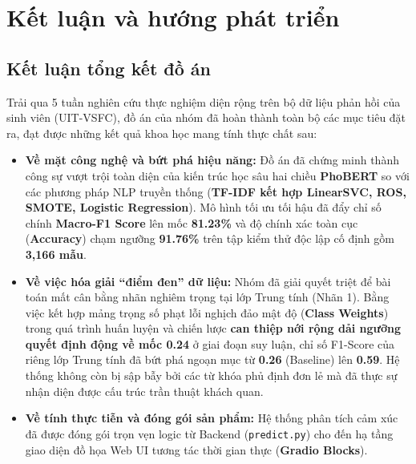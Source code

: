 \documentclass[conference,10pt,a4paper]{IEEEtran}
\begin{document}
\section{Kết luận và hướng phát triển}

\subsection{Kết luận tổng kết đồ án}
\noindent Trải qua 5 tuần nghiên cứu thực nghiệm diện rộng trên bộ dữ liệu phản hồi của sinh viên (UIT-VSFC), đồ án của nhóm đã hoàn thành toàn bộ các mục tiêu đặt ra, đạt được những kết quả khoa học mang tính thực chất sau:
\begin{itemize}
    \item \textbf{Về mặt công nghệ và bứt phá hiệu năng:} Đồ án đã chứng minh thành công sự vượt trội toàn diện của kiến trúc học sâu hai chiều \textbf{PhoBERT} so với các phương pháp NLP truyền thống (\textbf{TF-IDF kết hợp LinearSVC, ROS, SMOTE, Logistic Regression}). Mô hình tối ưu tối hậu đã đẩy chỉ số chính \textbf{Macro-F1 Score} lên mốc \textbf{81.23\%} và độ chính xác toàn cục (\textbf{Accuracy}) chạm ngưỡng \textbf{91.76\%} trên tập kiểm thử độc lập cố định gồm \textbf{3,166 mẫu}.
    
    \item \textbf{Về việc hóa giải ``điểm đen'' dữ liệu:} Nhóm đã giải quyết triệt để bài toán mất cân bằng nhãn nghiêm trọng tại lớp Trung tính (Nhãn 1). Bằng việc kết hợp mảng trọng số phạt lỗi nghịch đảo mật độ (\textbf{Class Weights}) trong quá trình huấn luyện và chiến lược \textbf{can thiệp nới rộng dải ngưỡng quyết định động về mốc 0.24} ở giai đoạn suy luận, chỉ số F1-Score của riêng lớp Trung tính đã bứt phá ngoạn mục từ \textbf{0.26} (Baseline) lên \textbf{0.59}. Hệ thống không còn bị sập bẫy bởi các từ khóa phủ định đơn lẻ mà đã thực sự nhận diện được cấu trúc trần thuật khách quan.
    
    \item \textbf{Về tính thực tiễn và đóng gói sản phẩm:} Hệ thống phân tích cảm xúc đã được đóng gói trọn vẹn logic từ Backend (\texttt{predict.py}) cho đến hạ tầng giao diện đồ họa Web UI tương tác thời gian thực (\textbf{Gradio Blocks}).
\end{itemize}
\end{document}
